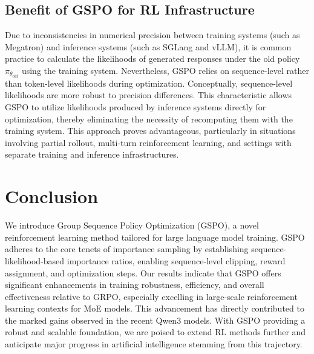 \subsection{Benefit of GSPO for RL Infrastructure}

Due to inconsistencies in numerical precision between training systems (such as Megatron) and inference systems (such as SGLang and vLLM), it is common practice to calculate the likelihoods of generated responses under the old policy $\pi_{\theta_\text{old}}$ using the training system. Nevertheless, GSPO relies on sequence-level rather than token-level likelihoods during optimization. Conceptually, sequence-level likelihoods are more robust to precision differences. This characteristic allows GSPO to utilize likelihoods produced by inference systems directly for optimization, thereby eliminating the necessity of recomputing them with the training system. This approach proves advantageous, particularly in situations involving partial rollout, multi-turn reinforcement learning, and settings with separate training and inference infrastructures.

\section{Conclusion}

We introduce Group Sequence Policy Optimization (GSPO), a novel reinforcement learning method tailored for large language model training. GSPO adheres to the core tenets of importance sampling by establishing sequence-likelihood-based importance ratios, enabling sequence-level clipping, reward assignment, and optimization steps. Our results indicate that GSPO offers significant enhancements in training robustness, efficiency, and overall effectiveness relative to GRPO, especially excelling in large-scale reinforcement learning contexts for MoE models. This advancement has directly contributed to the marked gains observed in the recent Qwen3 models. With GSPO providing a robust and scalable foundation, we are poised to extend RL methods further and anticipate major progress in artificial intelligence stemming from this trajectory.

